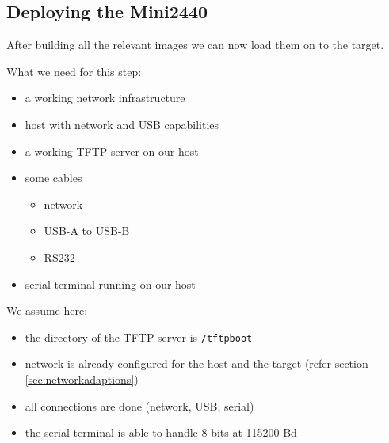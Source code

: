 %
%
%
%
%
%
%

\subsection{Deploying the Mini2440}	\label{sec:deploying}

After building all the relevant images we can now load them on to the target.

What we need for this step:

\begin{itemize}
 \item a working network infrastructure
 \item host with network and USB capabilities
 \item a working TFTP server on our host
 \item some cables
 \begin{itemize}
  \item network
  \item USB-A to USB-B
  \item RS232
 \end{itemize}
 \item serial terminal running on our host
\end{itemize}

We assume here:

\begin{itemize}
 \item the directory of the TFTP server is \texttt{/tftpboot}
 \item network is already configured for the host and the target
       (refer section \ref{sec:networkadaptions})
 \item all connections are done (network, USB, serial)
 \item the serial terminal is able to handle 8 bits at 115200 Bd
\end{itemize}

